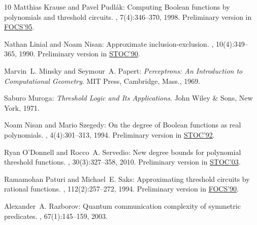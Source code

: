 \begin{thebibliography}{10}
{\sc Matthias Krause and Pavel Pudl{\'a}k}: Computing {B}oolean functions by
  polynomials and threshold circuits.
, 7(4):346--370, 1998.
\newblock Preliminary version in
  \href{http://dx.doi.org/10.1109/SFCS.1995.492670}{FOCS'95}.
\newblock [\epfmtdoi{10.1007/s000370050015}]

{\sc Nathan Linial and Noam Nisan}: Approximate inclusion-exclusion.
, 10(4):349--365, 1990.
\newblock Preliminary version in
  \href{http://dx.doi.org/10.1145/100216.100250}{STOC'90}.
\newblock [\epfmtdoi{10.1007/BF02128670}]

{\sc Marvin~L. Minsky and Seymour~A. Papert}: {\em Perceptrons: {A}n
  Introduction to Computational Geometry}.
\newblock MIT Press, Cambridge, Mass., 1969.

{\sc Saburo Muroga}: {\em Threshold Logic and Its Applications}.
\newblock John Wiley \& Sons, New York, 1971.

{\sc Noam Nisan and Mario Szegedy}: On the degree of {B}oolean functions as
  real polynomials.
, 4(4):301--313, 1994.
\newblock Preliminary version in
  \href{http://dx.doi.org/10.1145/129712.129757}{STOC'92}.
\newblock [\epfmtdoi{10.1007/BF01263419}]

{\sc Ryan O'Donnell and Rocco~A. Servedio}: New degree bounds for polynomial
  threshold functions.
, 30(3):327--358, 2010.
\newblock Preliminary version in
  \href{http://dx.doi.org/10.1145/780542.780592}{STOC'03}.
\newblock [\epfmtdoi{10.1007/s00493-010-2173-3}]

{\sc Ramamohan Paturi and Michael~E. Saks}: Approximating threshold circuits by
  rational functions.
, 112(2):257--272, 1994.
\newblock Preliminary version in
  \href{http://dx.doi.org/10.1109/FSCS.1990.89559}{FOCS'90}.

{\sc Alexander~A. Razborov}: Quantum communication complexity of symmetric
  predicates.
, 67(1):145--159, 2003.


\end{thebibliography}
